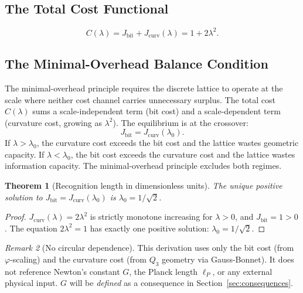 \documentclass[12pt]{article}
\newtheorem{theorem}{Theorem}[section]
\theoremstyle{definition}
\theoremstyle{remark}
\newtheorem{remark}[theorem]{Remark}
\begin{document}
\subsection{The Total Cost Functional}

\begin{equation}
  C(\lambda)
  = J_{\mathrm{bit}} + J_{\mathrm{curv}}(\lambda)
  = 1 + 2\lambda^2.
  \label{eq:total-cost}
\end{equation}

\subsection{The Minimal-Overhead Balance Condition}

The minimal-overhead principle requires the discrete
lattice to operate at the scale where neither cost channel carries
unnecessary surplus. The total cost $C(\lambda)$ sums a
scale-independent term (bit cost) and a scale-dependent term
(curvature cost, growing as $\lambda^2$). The equilibrium is at
the crossover:
\begin{equation}
  J_{\mathrm{bit}} = J_{\mathrm{curv}}(\lambda_0).
  \label{eq:balance}
\end{equation}
If $\lambda > \lambda_0$, the curvature cost exceeds the bit cost and
the lattice wastes geometric capacity. If $\lambda < \lambda_0$, the
bit cost exceeds the curvature cost and the lattice wastes information
capacity. The minimal-overhead principle excludes both regimes.

\begin{theorem}[Recognition length in dimensionless units]
\label{thm:lambda-dimless}
The unique positive solution to $J_{\mathrm{bit}} =
J_{\mathrm{curv}}(\lambda_0)$ is $\lambda_0 = 1/\sqrt{2}$.
\end{theorem}

\begin{proof}
$J_{\mathrm{curv}}(\lambda) = 2\lambda^2$ is strictly monotone
increasing for $\lambda > 0$, and $J_{\mathrm{bit}} = 1 > 0$. The
equation $2\lambda^2 = 1$ has exactly one positive solution:
$\lambda_0 = 1/\sqrt{2}$.
\end{proof}

\begin{remark}[No circular dependence]
This derivation uses only the bit cost (from $\varphi$-scaling) and
the curvature cost (from $Q_3$ geometry via Gauss-Bonnet). It does
not reference Newton's constant $G$, the Planck length $\ell_P$, or
any external physical input. $G$ will be \emph{defined} as a
consequence in Section~\ref{sec:consequences}.
\end{remark}
\end{document}
